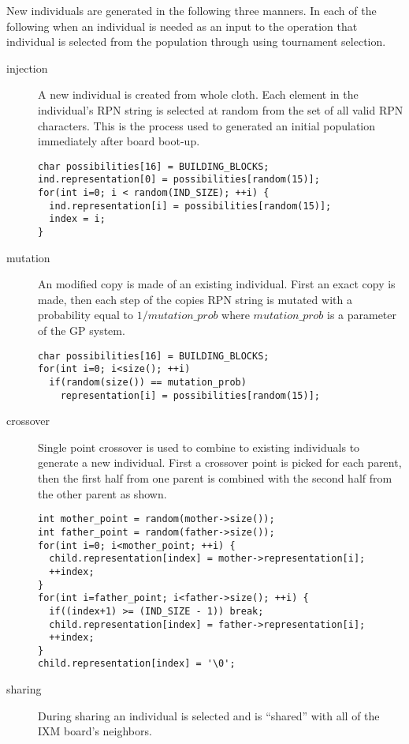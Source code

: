 \documentclass[11pt]{article}
\begin{document}
New individuals are generated in the following three manners.  In each
of the following when an individual is needed as an input to the
operation that individual is selected from the population through
using tournament selection.
\begin{description}
\item[injection] A new individual is created from whole cloth.  Each
     element in the individual's RPN string is selected at random from
     the set of all valid RPN characters.  This is the process used to
     generated an initial population immediately after board boot-up.
\lstset{language=c++}
\begin{lstlisting}
char possibilities[16] = BUILDING_BLOCKS;
ind.representation[0] = possibilities[random(15)];
for(int i=0; i < random(IND_SIZE); ++i) {
  ind.representation[i] = possibilities[random(15)];
  index = i;
}
\end{lstlisting}
\item[mutation] An modified copy is made of an existing individual.
     First an exact copy is made, then each step of the copies RPN
     string is mutated with a probability equal to $1/mutation\_prob$
     where $mutation\_prob$ is a parameter of the GP system.
\lstset{language=c++}
\begin{lstlisting}
char possibilities[16] = BUILDING_BLOCKS;
for(int i=0; i<size(); ++i)
  if(random(size()) == mutation_prob)
    representation[i] = possibilities[random(15)];
\end{lstlisting}
\item[crossover] Single point crossover is used to combine to existing
     individuals to generate a new individual.  First a crossover
     point is picked for each parent, then the first half from one
     parent is combined with the second half from the other parent as
     shown.
\lstset{language=c++}
\begin{lstlisting}
int mother_point = random(mother->size());
int father_point = random(father->size());
for(int i=0; i<mother_point; ++i) {
  child.representation[index] = mother->representation[i];
  ++index;
}
for(int i=father_point; i<father->size(); ++i) {
  if((index+1) >= (IND_SIZE - 1)) break;
  child.representation[index] = father->representation[i];
  ++index;
}
child.representation[index] = '\0';
\end{lstlisting}
\item[sharing] During sharing an individual is selected and is ``shared''
     with all of the IXM board's neighbors.
\end{description}
\end{document}
